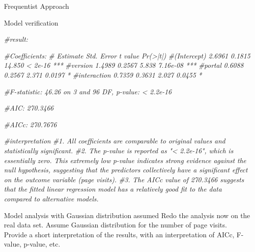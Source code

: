 \documentclass[
  ignorenonframetext,
]{beamer}
\newenvironment{Shaded}{\begin{snugshade}}{\end{snugshade}}
\newcommand{\CommentTok}[1]{\textcolor[rgb]{0.56,0.35,0.01}{\textit{#1}}}
\newcommand{\FunctionTok}[1]{\textcolor[rgb]{0.00,0.00,0.00}{#1}}
\newcommand{\NormalTok}[1]{#1}
\newcommand{\OtherTok}[1]{\textcolor[rgb]{0.56,0.35,0.01}{#1}}
\newcommand{\SpecialCharTok}[1]{\textcolor[rgb]{0.00,0.00,0.00}{#1}}
\newcommand{\StringTok}[1]{\textcolor[rgb]{0.31,0.60,0.02}{#1}}
\begin{document}
\begin{frame}[fragile]{Frequentist Approach}
\begin{block}{Model verification}
\begin{Shaded}
\begin{Highlighting}[]
\CommentTok{\#result:}

\CommentTok{\#Coefficients:}
\CommentTok{\#            Estimate Std. Error t value Pr(\textgreater{}|t|)    }
\CommentTok{\#(Intercept)   2.6961     0.1815  14.850  \textless{} 2e{-}16 ***}
\CommentTok{\#version       1.4989     0.2567   5.838 7.16e{-}08 ***}
\CommentTok{\#portal        0.6088     0.2567   2.371   0.0197 *  }
\CommentTok{\#interaction   0.7359     0.3631   2.027   0.0455 *  }

\CommentTok{\#F{-}statistic: 46.26 on 3 and 96 DF,  p{-}value: \textless{} 2.2e{-}16}

\CommentTok{\#AIC: 270.3466}

\CommentTok{\#AICc: 270.7676}

\CommentTok{\#interpretation}
\CommentTok{\#1. All coefficients are comparable to original values and statistically significant.}
\CommentTok{\#2. The p{-}value is reported as "\textless{} 2.2e{-}16", which is essentially zero. This extremely low p{-}value indicates strong evidence against the null hypothesis, suggesting that the predictors collectively have a significant effect on the outcome variable (page visits).}
\CommentTok{\#3. The AICc value of 270.3466 suggests that the fitted linear regression model has a relatively good fit to the data compared to alternative models.}
\end{Highlighting}
\end{Shaded}
\end{block}

\begin{block}{Model analysis with Gaussian distribution assumed}
\protect\hypertarget{model-analysis-with-gaussian-distribution-assumed}{}
Redo the analysis now on the real data set. Assume Gaussian distribution
for the number of page visits. Provide a short interpretation of the
results, with an interpretation of AICc, F-value, p-value, etc.

\begin{Shaded}
\end{Shaded}
\end{block}
\end{frame}
\end{document}
